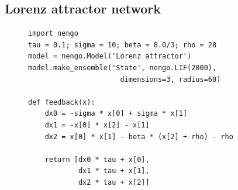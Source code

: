 \documentclass{frontiersSCNS}
\begin{document}
\subsection{Lorenz attractor network} \label{sec:lorenz}

\begin{figure}
\begin{center}
  \begin{minipage}{0.43\textwidth}
    \begin{lstlisting}[basicstyle={\footnotesize\ttfamily}]
import nengo
tau = 0.1; sigma = 10; beta = 8.0/3; rho = 28
model = nengo.Model('Lorenz attractor')
model.make_ensemble('State', nengo.LIF(2000),
                      dimensions=3, radius=60)

def feedback(x):
    dx0 = -sigma * x[0] + sigma * x[1]
    dx1 = -x[0] * x[2] - x[1]
    dx2 = x[0] * x[1] - beta * (x[2] + rho) - rho

    return [dx0 * tau + x[0],
            dx1 * tau + x[1],
            dx2 * tau + x[2]]


\end{lstlisting}
\end{minipage}
\end{center}
\end{figure}
\end{document}
